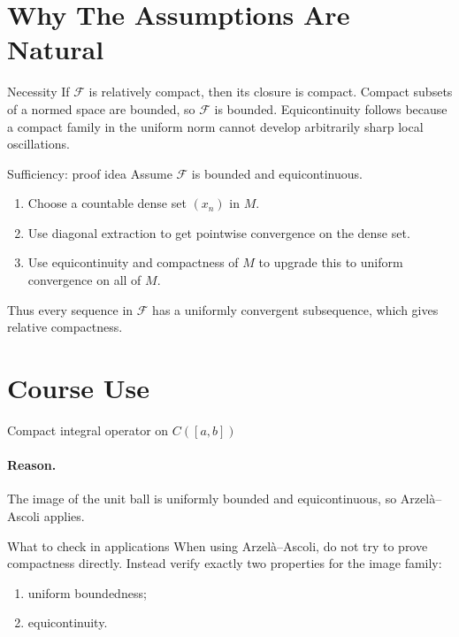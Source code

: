 \documentclass[11pt]{article}
\begin{document}
\section{Why The Assumptions Are Natural}

\begin{exbox}{Necessity}
If $\mathcal F$ is relatively compact, then its closure is compact. Compact subsets of a normed space are bounded, so $\mathcal F$ is bounded. Equicontinuity follows because a compact family in the uniform norm cannot develop arbitrarily sharp local oscillations.
\end{exbox}

\begin{exbox}{Sufficiency: proof idea}
Assume $\mathcal F$ is bounded and equicontinuous.
\begin{enumerate}
\item Choose a countable dense set $(x_n)$ in $M$.
\item Use diagonal extraction to get pointwise convergence on the dense set.
\item Use equicontinuity and compactness of $M$ to upgrade this to uniform convergence on all of $M$.
\end{enumerate}
Thus every sequence in $\mathcal F$ has a uniformly convergent subsequence, which gives relative compactness.
\end{exbox}

\section{Course Use}

\begin{thmbox}{Compact integral operator on $C([a,b])$}
\thmIntegralOperator
\end{thmbox}

\paragraph{Reason.}
The image of the unit ball is uniformly bounded and equicontinuous, so Arzel\`a--Ascoli applies.

\begin{warningbox}{What to check in applications}
When using Arzel\`a--Ascoli, do not try to prove compactness directly. Instead verify exactly two properties for the image family:
\begin{enumerate}
\item uniform boundedness;
\item equicontinuity.
\end{enumerate}
\end{warningbox}
\end{document}
